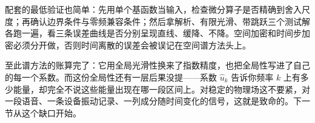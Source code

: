 配套的最低验证也简单：先用单个基函数当输入，检查微分算子是否精确到舍入尺度；再确认边界条件与零频兼容条件；然后拿解析、有限光滑、带跳跃三个测试解各跑一遍，看三条误差曲线是否分别呈现直线、缓降、不降。空间加密和时间步加密必须分开做，否则时间离散的误差会被误记在空间谱方法头上。

至此谱方法的账算完了：它用全局光滑性换来了指数精度，也把全局性写进了自己的每一个系数。而这份全局性还有一层后果没提——系数 \(\hat u_k\) 告诉你频率 \(k\) 上有多少能量，却完全不说这些能量出现在哪一段区间上。对稳定的物理场这不要紧，对一段语音、一条设备振动记录、一列成分随时间变化的信号，这就是致命的。下一节从这个缺口开始。
